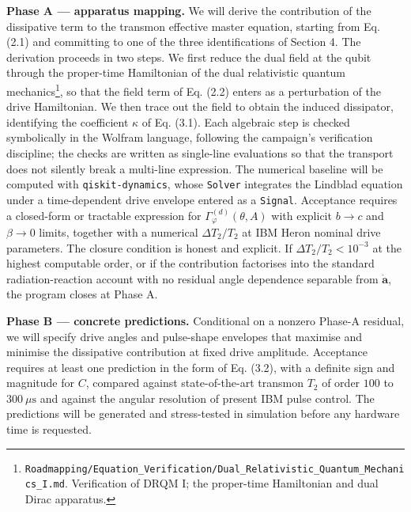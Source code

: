\documentclass[
  11pt,
]{article}
\begin{document}
\textbf{Phase A --- apparatus mapping.} We will derive the contribution
of the dissipative term to the transmon effective master equation,
starting from Eq. (2.1) and committing to one of the three
identifications of Section 4. The derivation proceeds in two steps. We
first reduce the dual field at the qubit through the proper-time
Hamiltonian of the dual relativistic quantum mechanics\footnote{\texttt{Roadmapping/Equation\_Verification/Dual\_Relativistic\_Quantum\_Mechanics\_I.md}.
  Verification of DRQM I; the proper-time Hamiltonian and dual Dirac
  apparatus.}, so that the field term of Eq. (2.2) enters as a
perturbation of the drive Hamiltonian. We then trace out the field to
obtain the induced dissipator, identifying the coefficient \(\kappa\) of
Eq. (3.1). Each algebraic step is checked symbolically in the Wolfram
language, following the campaign's verification discipline; the checks
are written as single-line evaluations so that the transport does not
silently break a multi-line expression. The numerical baseline will be
computed with \texttt{qiskit-dynamics}, whose \texttt{Solver} integrates
the Lindblad equation under a time-dependent drive envelope entered as a
\texttt{Signal}. Acceptance requires a closed-form or tractable
expression for \(\Gamma_\varphi^{(d)}(\theta, A)\) with explicit
\(b\to c\) and \(\beta\to 0\) limits, together with a numerical
\(\Delta T_2/T_2\) at IBM Heron nominal drive parameters. The closure
condition is honest and explicit. If \(\Delta T_2/T_2 < 10^{-3}\) at the
highest computable order, or if the contribution factorises into the
standard radiation-reaction account with no residual angle dependence
separable from \(\dot{\mathbf{a}}\), the program closes at Phase A.

\textbf{Phase B --- concrete predictions.} Conditional on a nonzero
Phase-A residual, we will specify drive angles and pulse-shape envelopes
that maximise and minimise the dissipative contribution at fixed drive
amplitude. Acceptance requires at least one prediction in the form of
Eq. (3.2), with a definite sign and magnitude for \(C\), compared
against state-of-the-art transmon \(T_2\) of order \(100\) to
\(300~\mu\text{s}\) and against the angular resolution of present IBM
pulse control. The predictions will be generated and stress-tested in
simulation before any hardware time is requested.
\end{document}
